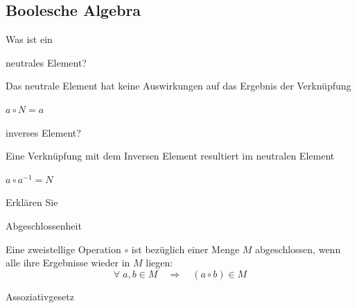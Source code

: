 \documentclass
[
  draft    = true,
  fontsize = 11pt,
  parskip  = half-,
  BCOR     = 0pt,
  DIV      = 11,
  ngerman,
  dvipsnames
]
{scrartcl}
\begin{document}
\subsection*{Boolesche Algebra}
\begin{mytemize}
  \item Was ist ein
        \begin{mytemize}
          \item neutrales Element?
	          \begin{mytemize}
	          	\begin{karsten}
	          		\item Das neutrale Element hat keine Auswirkungen auf das Ergebnis der Verknüpfung
	          		\item $a \circ N = a$
	          	\end{karsten}
        \end{mytemize}
          \item inverses Element?
	          \begin{mytemize}
		          \begin{karsten}
		          	\item Eine Verknüpfung mit dem Inversen Element resultiert im neutralen Element
		          	\item $a \circ a^{-1} = N$
		          \end{karsten}
	          \end{mytemize}
        \end{mytemize}
  \item Erklären Sie
        \begin{mytemize}
          \item Abgeschlossenheit
                \begin{achim}
                  \begin{mytemize}
                    \item Eine zweistellige Operation $\circ$ ist bezüglich einer Menge $M$ abgeschlossen,
                          wenn alle ihre Ergebnisse wieder in $M$ liegen:
                          \begin{equation*}
                            \forall\;a,b\in M\quad\Rightarrow\quad(a\circ b)\in M
                          \end{equation*}
                  \end{mytemize}
                \end{achim}
          \item Assoziativgesetz

\end{mytemize}
\end{mytemize}
\end{document}
